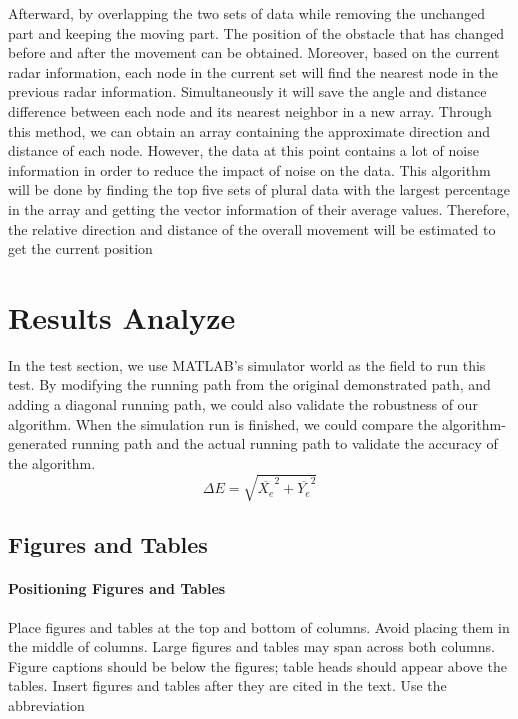 \documentclass[conference]{IEEEtran}
\begin{document}
Afterward, by overlapping the two sets of data while removing the unchanged part and keeping the moving part. The position of the obstacle that has changed before and after the movement can be obtained. Moreover, based on the current radar information, each node in the current set will find the nearest node in the previous radar information. Simultaneously it will save the angle and distance difference between each node and its nearest neighbor in a new array. Through this method, we can obtain an array containing the approximate direction and distance of each node. However, the data at this point contains a lot of noise information in order to reduce the impact of noise on the data. This algorithm will be done by finding the top five sets of plural data with the largest percentage in the array and getting the vector information of their average values. Therefore, the relative direction and distance of the overall movement will be estimated to get the current position

\section{Results Analyze}
In the test section, we use MATLAB's simulator world as the field to run this test. By modifying the running path from the original demonstrated path, and adding a diagonal running path, we could also validate the robustness of our algorithm. When the simulation run is finished, we could compare the algorithm-generated running path and the actual running path to validate the accuracy of the algorithm.
\begin{equation}
\Delta E = \sqrt{\overline{X_e}^2 + \overline{Y_e}^2}\label{eqError}
\end{equation}

\subsection{Figures and Tables}
\paragraph{Positioning Figures and Tables} Place figures and tables at the top and 
bottom of columns. Avoid placing them in the middle of columns. Large 
figures and tables may span across both columns. Figure captions should be 
below the figures; table heads should appear above the tables. Insert 
figures and tables after they are cited in the text. Use the abbreviation
\end{document}

